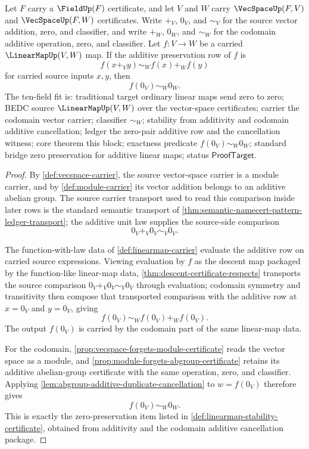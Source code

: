 \begin{theorem}
\label{thm:linearmap-zero-preservation-from-additivity}
Let $F$ carry a $\FieldUp(F)$ certificate, and let $V$ and $W$ carry $\VecSpaceUp(F,V)$ and $\VecSpaceUp(F,W)$ certificates. Write $+_V$, $0_V$, and $\sim_V$ for the source vector addition, zero, and classifier, and write $+_W$, $0_W$, and $\sim_W$ for the codomain additive operation, zero, and classifier. Let $f:V\to W$ be a carried $\LinearMapUp(V,W)$ map. If the additive preservation row of $f$ is
$$
f(x+_V y)\sim_W f(x)+_W f(y)
$$
for carried source inputs $x,y$, then
$$
f(0_V)\sim_W0_W.
$$
The ten-field fit is: traditional target ordinary linear maps send zero to zero; BEDC source $\LinearMapUp(V,W)$ over the vector-space certificates; carrier the codomain vector carrier; classifier $\sim_W$; stability from additivity and codomain additive cancellation; ledger the zero-pair additive row and the cancellation witness; core theorem this block; exactness predicate $f(0_V)\sim_W0_W$; standard bridge zero preservation for additive linear maps; status $\mathsf{ProofTarget}$.
\end{theorem}
\begin{proof}
By \autoref{def:vecspace-carrier}, the source vector-space carrier is a module carrier, and by \autoref{def:module-carrier} its vector addition belongs to an additive abelian group. The source carrier transport used to read this comparison inside later rows is the standard semantic transport of \autoref{thm:semantic-namecert-pattern-ledger-transport}; the additive unit law supplies the source-side comparison
$$
0_V+_V0_V\sim_V0_V.
$$

The function-with-law data of \autoref{def:linearmap-carrier} evaluate the additive row on carried source expressions. Viewing evaluation by $f$ as the descent map packaged by the function-like linear-map data, \autoref{thm:descent-certificate-respects} transports the source comparison $0_V+_V0_V\sim_V0_V$ through evaluation; codomain symmetry and transitivity then compose that transported comparison with the additive row at $x=0_V$ and $y=0_V$, giving
$$
f(0_V)\sim_W f(0_V)+_W f(0_V).
$$
The output $f(0_V)$ is carried by the codomain part of the same linear-map data.

For the codomain, \autoref{prop:vecspace-forgets-module-certificate} reads the vector space as a module, and \autoref{prop:module-forgets-abgroup-certificate} retains its additive abelian-group certificate with the same operation, zero, and classifier. Applying \autoref{lem:abgroup-additive-duplicate-cancellation} to $w=f(0_V)$ therefore gives
$$
f(0_V)\sim_W0_W.
$$
This is exactly the zero-preservation item listed in \autoref{def:linearmap-stability-certificate}, obtained from additivity and the codomain additive cancellation package.
\end{proof}

